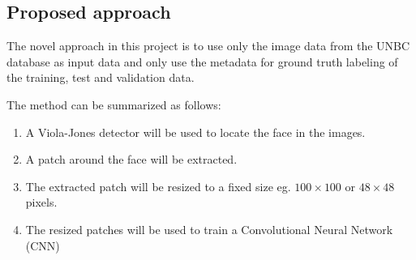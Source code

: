 \documentclass[Main]{subfiles}
\begin{document}

	\subsection{Proposed approach} %
		\label{sub:proposed_approach}
		The novel approach in this project is to use only the image data from the UNBC database as input data and only use the metadata for ground truth labeling of the training, test and validation data.

		The method can be summarized as follows:
		\begin{enumerate}
			\item 
			A Viola-Jones detector  will be used to locate the face in the images.
			
			\item 
			A patch around the face will be extracted.

			\item
			The extracted patch will be resized to a fixed size eg. $100 \times 100$ or $48 \times 48$ pixels.

			\item
			The resized patches will be used to train a Convolutional Neural Network (CNN)

		\end{enumerate}




	
\end{document}
